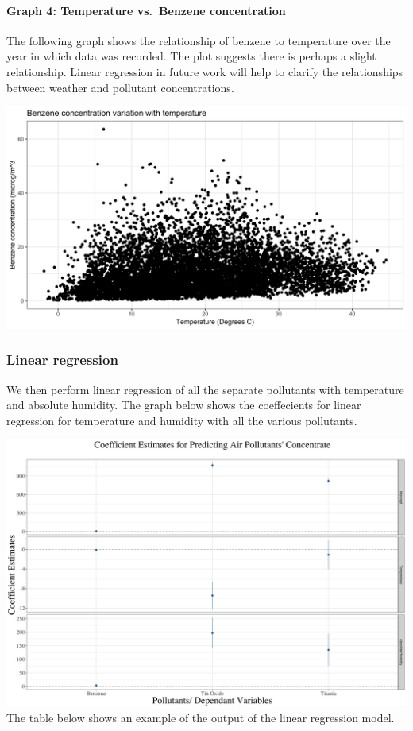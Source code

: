 \documentclass[]{article}
\let\oldparagraph\paragraph
\renewcommand{\paragraph}[1]{\oldparagraph{#1}\mbox{}}
\begin{document}
\hypertarget{graph-4-temperature-vs.benzene-concentration}{%
\paragraph{Graph 4: Temperature vs.~Benzene
concentration}\label{graph-4-temperature-vs.benzene-concentration}}

The following graph shows the relationship of benzene to temperature
over the year in which data was recorded. The plot suggests there is
perhaps a slight relationship. Linear regression in future work will
help to clarify the relationships between weather and pollutant
concentrations.

\includegraphics{../Images/tempvsbenzene.png}

\hypertarget{linear-regression}{%
\subsubsection{Linear regression}\label{linear-regression}}

We then perform linear regression of all the separate pollutants with
temperature and absolute humidity. The graph below shows the
coeffecients for linear regression for temperature and humidity with all
the various pollutants.

\includegraphics{../Images/CoefPlot_Group4.png} The table below shows an
example of the output of the linear regression model.
\end{document}
